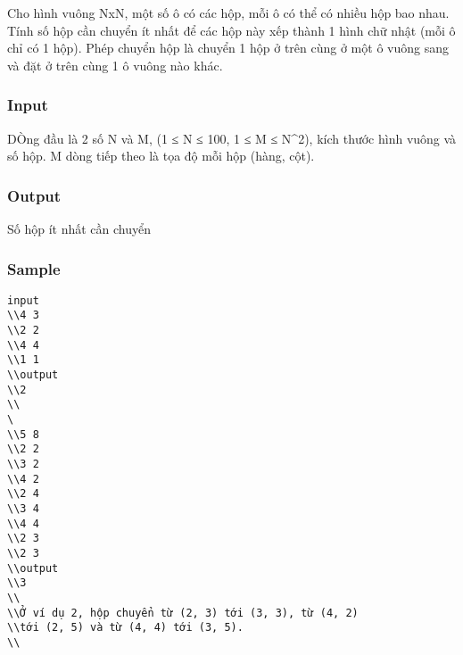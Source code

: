 









   Cho hình vuông NxN, một số ô có các hộp, mỗi ô có thể có nhiều hộp bao nhau. Tính số hộp cần chuyển ít nhất để các hộp này xếp thành 1 hình chữ nhật (mỗi ô chỉ có 1 hộp). Phép chuyển hộp là chuyển 1 hộp ở trên cùng ở một ô vuông sang và đặt ở trên cùng 1 ô vuông nào khác.  



\subsubsection{   Input  }



   DÒng đầu là 2 số N và M,  (1 ≤ N ≤ 100, 1 ≤ M ≤ N^2), kích thước hình vuông và số hộp. M dòng tiếp theo là tọa độ mỗi hộp (hàng, cột).  



\subsubsection{   Output  }



   Số hộp ít nhất cần chuyển  



\subsubsection{   Sample  }
\begin{verbatim}
input
\\4 3
\\2 2
\\4 4
\\1 1
\\output
\\2
\\
\
\\5 8
\\2 2
\\3 2
\\4 2
\\2 4
\\3 4
\\4 4
\\2 3
\\2 3
\\output
\\3
\\
\\Ở ví dụ 2, hộp chuyển từ (2, 3) tới (3, 3), từ (4, 2)
\\tới (2, 5) và từ (4, 4) tới (3, 5).
\\\end{verbatim}

